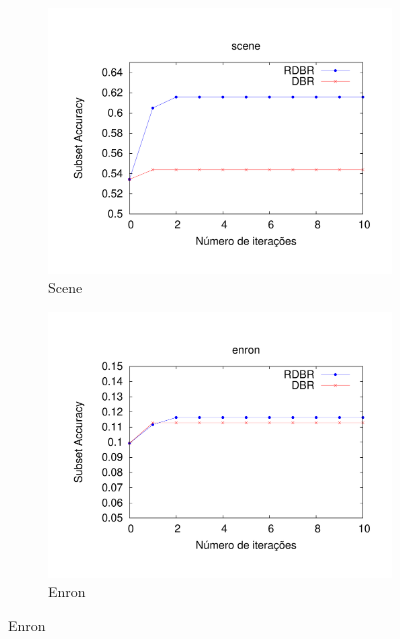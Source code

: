 \begin{figure}
\begin{subfigure}{.5\textwidth}
  \centering
  \includegraphics[angle=-90, width=1\linewidth]{plots/scene.pdf}
  \caption{Scene}
  \label{fig:subscene}
\end{subfigure}%
\begin{subfigure}{.5\textwidth}
  \centering
  \includegraphics[angle=-90, width=1\linewidth]{plots/enron.pdf}
  \caption{Enron}
  \label{fig:subenron}
\end{subfigure}


\end{figure}
